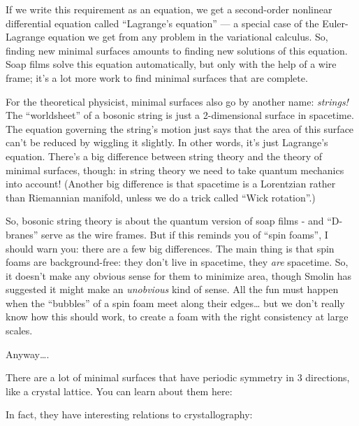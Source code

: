 \documentclass{article}
\def\tightlist{}
\renewcommand{\texttt}[1]{%
  \begingroup
  \ttfamily
  \begingroup\lccode`~=`/\lowercase{\endgroup\def~}{/\discretionary{}{}{}}%
  \begingroup\lccode`~=`[\lowercase{\endgroup\def~}{[\discretionary{}{}{}}%
  \begingroup\lccode`~=`.\lowercase{\endgroup\def~}{.\discretionary{}{}{}}%
  \catcode`/=\active\catcode`[=\active\catcode`.=\active
  \scantokens{#1\noexpand}%
  \endgroup
}
\begin{document}
If we write this requirement as an equation, we get a second-order
nonlinear differential equation called ``Lagrange's equation'' --- a
special case of the Euler-Lagrange equation we get from any problem in
the variational calculus. So, finding new minimal surfaces amounts to
finding new solutions of this equation. Soap films solve this equation
automatically, but only with the help of a wire frame; it's a lot more
work to find minimal surfaces that are complete.

For the theoretical physicist, minimal surfaces also go by another name:
\emph{strings!} The ``worldsheet'' of a bosonic string is just a
2-dimensional surface in spacetime. The equation governing the string's
motion just says that the area of this surface can't be reduced by
wiggling it slightly. In other words, it's just Lagrange's equation.
There's a big difference between string theory and the theory of minimal
surfaces, though: in string theory we need to take quantum mechanics
into account! (Another big difference is that spacetime is a Lorentzian
rather than Riemannian manifold, unless we do a trick called ``Wick
rotation''.)

So, bosonic string theory is about the quantum version of soap films -
and ``D-branes'' serve as the wire frames. But if this reminds you of
``spin foams'', I should warn you: there are a few big differences. The
main thing is that spin foams are background-free: they don't live in
spacetime, they \emph{are} spacetime. So, it doesn't make any obvious
sense for them to minimize area, though Smolin has suggested it might
make an \emph{unobvious} kind of sense. All the fun must happen when the
``bubbles'' of a spin foam meet along their edges\ldots{} but we don't
really know how this should work, to create a foam with the right
consistency at large scales.

Anyway\ldots.

There are a lot of minimal surfaces that have periodic symmetry in 3
directions, like a crystal lattice. You can learn about them here:


In fact, they have interesting relations to crystallography:
\end{document}

